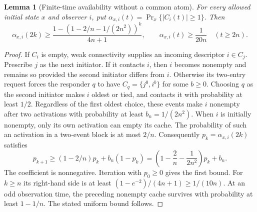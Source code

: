 \documentclass[11pt]{article}
\newtheorem{lemma}[theorem]{Lemma}
\begin{document}
\begin{lemma}[Finite-time availability without a common atom]
\label{lem:c2transientavailability}
For every allowed initial state $x$ and observer $i$, put
$\alpha_{x,i}(t)=\Pr_x\{|C_i(t)|\ge1\}$. Then
\[
 \alpha_{x,i}(2k)\ge
 \frac{1-(1-2/n-1/(2n^2))^k}{4n+1},
 \qquad
 \alpha_{x,i}(t)\ge\frac1{20n}\quad(t\ge2n).
\]
\end{lemma}
\begin{proof}
If $C_i$ is empty, weak connectivity supplies an incoming
descriptor $i\in C_j$. Prescribe $j$ as the next initiator.
If it contacts $i$, then $i$ becomes nonempty and remains so
provided the second initiator differs from $i$.
Otherwise its two-entry request forces the responder $q$
to have $C_q=\{j^0,i^b\}$ for some $b\ge0$.
Choosing $q$ as the second initiator makes $i$ oldest or tied,
and contacts it with probability at least $1/2$.
Regardless of the first oldest choice, these events make $i$
nonempty after two activations with probability at least
$b_n=1/(2n^2)$. When $i$ is initially nonempty, only its own
activation can empty its cache. The probability of such an
activation in a two-event block is at most $2/n$.
Consequently $p_k=\alpha_{x,i}(2k)$ satisfies
\[
 p_{k+1}\ge (1-2/n)p_k+b_n(1-p_k)
 =\left(1-\frac2n-\frac1{2n^2}\right)p_k+b_n.
\]
The coefficient is nonnegative. Iteration with $p_0\ge0$
gives the first bound. For $k\ge n$ its right-hand side
is at least $(1-e^{-2})/(4n+1)\ge1/(10n)$.
At an odd observation time, the preceding nonempty cache
survives with probability at least $1-1/n$.
The stated uniform bound follows.
\end{proof}
\end{document}
